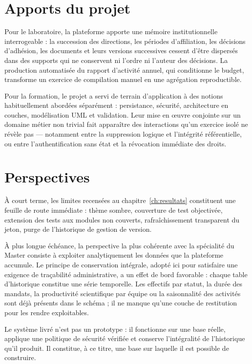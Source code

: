 \section{Apports du projet}

Pour le laboratoire, la plateforme apporte une mémoire institutionnelle interrogeable : la
succession des directions, les périodes d'affiliation, les décisions d'adhésion, les
documents et leurs versions successives cessent d'être dispersés dans des supports qui ne
conservent ni l'ordre ni l'auteur des décisions. La production automatisée du rapport
d'activité annuel, qui conditionne le budget, transforme un exercice de compilation manuel
en une agrégation reproductible.

Pour la formation, le projet a servi de terrain d'application à des notions habituellement
abordées séparément : persistance, sécurité, architecture en couches, modélisation UML et
validation. Leur mise en œuvre conjointe sur un domaine métier non trivial fait apparaître
des interactions qu'un exercice isolé ne révèle pas --- notamment entre la suppression
logique et l'intégrité référentielle, ou entre l'authentification sans état et la
révocation immédiate des droits.

\section{Perspectives}

À court terme, les limites recensées au chapitre~\ref{ch:resultats} constituent une feuille
de route immédiate : thème sombre, couverture de test objectivée, extension des tests aux
modules non couverts, rafraîchissement transparent du jeton, purge de l'historique de
gestion de version.

À plus longue échéance, la perspective la plus cohérente avec la spécialité du Master
consiste à exploiter analytiquement les données que la plateforme accumule. Le principe de
conservation intégrale, adopté ici pour satisfaire une exigence de traçabilité
administrative, a un effet de bord favorable : chaque table d'historique constitue une
série temporelle. Les effectifs par statut, la durée des mandats, la productivité
scientifique par équipe ou la saisonnalité des activités sont déjà présents dans le
schéma ; il ne manque qu'une couche de restitution pour les rendre exploitables.

Le système livré n'est pas un prototype : il fonctionne sur une base réelle, applique une
politique de sécurité vérifiée et conserve l'intégralité de l'historique qu'il produit. Il
constitue, à ce titre, une base sur laquelle il est possible de construire.
